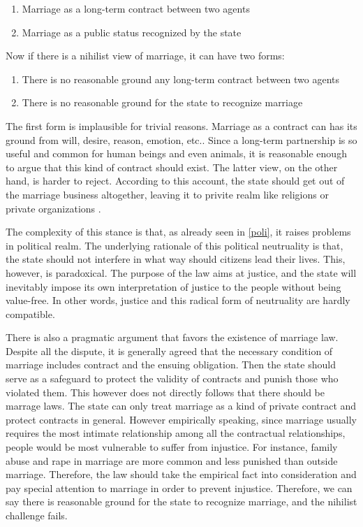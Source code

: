 \documentclass[man,floatsintext]{apa7}
\begin{document}
\begin{enumerate}
\item {Marriage as a long-term contract between two agents}
\item {Marriage as a public status recognized by the state}
\end{enumerate}

Now if there is a nihilist view of marriage, it can have two forms:

\begin{enumerate}
\item {There is no reasonable ground any long-term contract between two agents}
\item {There is no reasonable ground for the state to recognize marriage}
\end{enumerate}

The first form is implausible for trivial reasons. Marriage as a contract can has its ground from will, desire, reason, emotion, etc.. Since a long-term partnership is so useful and common for human beings and even animals, it is reasonable enough to argue that this kind of contract should exist. The latter view, on the other hand, is harder to reject. According to this account, the state should get out of the marriage business altogether, leaving it to privite realm like religions or private organizations \autocite{sunsteinPrivatizingMarriage2008,chartierPublicPracticePrivate2016}.

The complexity of this stance is that, as already seen in \ref{poli}, it raises problems in political realm. The underlying rationale of this political neutruality is that, the state should not interfere in what way should citizens lead their lives. This, however, is paradoxical. The purpose of the law aims at justice, and the state will inevitably impose its own interpretation of justice to the people without being value-free. In other words, justice and this radical form of neutruality are hardly compatible. 

There is also a pragmatic argument that favors the existence of marriage law. Despite all the dispute, it is generally agreed that the necessary condition of marriage includes contract and the ensuing obligation.\autocite{brakeMarriageDomesticPartnership2023} Then the state should serve as a safeguard to protect the validity of contracts and punish those who violated them. This however does not directly follows that there should be marrage laws. The state can only treat marriage as a kind of private contract and protect contracts in general. However empirically speaking, since marriage usually requires the most intimate relationship among all the contractual relationships, people would be most vulnerable to suffer from injustice. For instance, family abuse and rape in marriage are more common and less punished than outside marriage. Therefore, the law should take the empirical fact into consideration and pay special attention to marriage in order to prevent injustice. Therefore, we can say there is reasonable ground for the state to recognize marriage, and the nihilist challenge fails.
\end{document}
